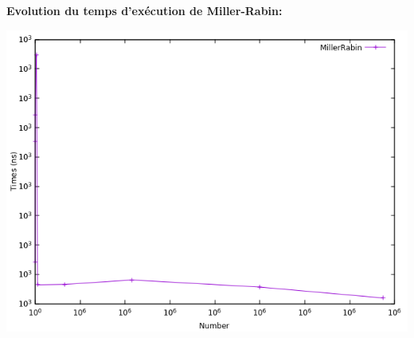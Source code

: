 		\begin{frame}
		\textbf{Evolution du temps d'exécution de Miller-Rabin: }
		\begin{center}\includegraphics[scale=0.6]{miller.png}\end{center}
		\end{frame}
		
